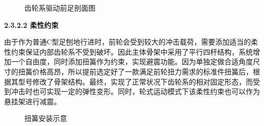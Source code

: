 \documentclass[12pt]{article}
\begin{document}
\begin{CJK}{UTF8}{gbsn}
\begin{figure}[H]
{%
}
\quad
{}
\quad
\caption{齿轮系驱动前足剖面图}
\end{figure}
\textbf{2.3.2.2	柔性约束}\par
由于作为普通C型足刨地行进时，前轮会受到较大的冲击载荷，需要添加适当的柔性约束保证内部齿轮系不受到破坏。因此主体骨架中采用了平行四杆结构，系统增加一个自由度，同时添加扭簧作为约束，实现避震功能。因为单独定做合适角度尺寸的扭簧价格高昂，所以提前选定好了一款满足前轮扭力需求的标准件扭簧后，根据其型号修改了骨架结构。最终，实现了正常状况下齿轮系的相对固定形态，而受到冲击时也可实现一定的弹性变形。同时，轮式运动模式下该柔性约束也可以作为悬挂架进行减震。
 \begin{figure}[H]
{}
\quad
{}
\quad
\caption{扭簧安装示意}
\end{figure}


\end{CJK}
\end{document}
